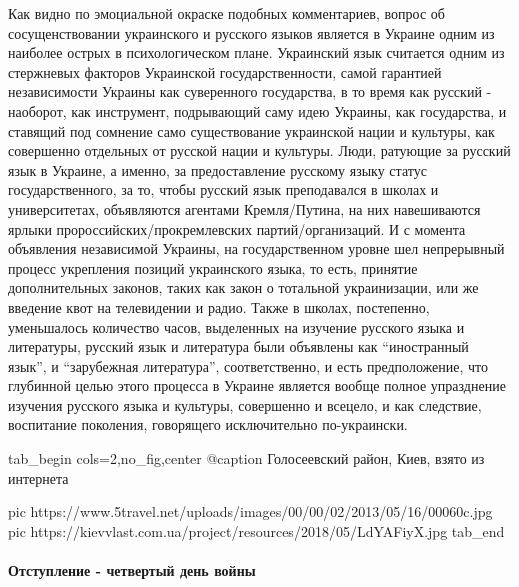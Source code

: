 Как видно по эмоциальной окраске подобных комментариев, вопрос об
сосущенствовании украинского и русского языков является в Украине одним из
наиболее острых в психологическом плане. Украинский язык считается одним из
стержневых факторов Украинской государственности, самой гарантией независимости
Украины как суверенного государства, в то время как русский - наоборот, как
инструмент, подрывающий саму идею Украины, как государства, и ставящий под
сомнение само существование украинской нации и культуры, как совершенно
отдельных от русской нации и культуры. Люди, ратующие за русский язык в
Украине, а именно, за предоставление русскому языку статус государственного, за
то, чтобы русский язык преподавался в школах и университетах, объявляются
агентами Кремля/Путина, на них навешиваются ярлыки пророссийских/прокремлевских
партий/организаций. И с момента объявления независимой Украины, на
государственном уровне шел непрерывный процесс укрепления позиций украинского
языка, то есть, принятие дополнительных законов, таких как закон о тотальной
украинизации, или же введение квот на телевидении и радио. Также в школах,
постепенно, уменьшалось количество часов, выделенных на изучение русского языка
и литературы, русский язык и литература были объявлены как \enquote{иностранный
язык}, и \enquote{зарубежная литература}, соответственно, и есть предположение, что глубинной
целью этого процесса в Украине является вообще полное упразднение изучения
русского языка и культуры, совершенно и всецело, и как следствие, воспитание
поколения, говорящего исключительно по-украински.

\ifcmt
  tab_begin cols=2,no_fig,center
     @caption Голосеевский район, Киев, взято из интернета

     pic https://www.5travel.net/uploads/images/00/00/02/2013/05/16/00060c.jpg
     pic https://kievvlast.com.ua/project/resources/2018/05/LdYAFiyX.jpg
  tab_end
\fi

\paragraph{Отступление - четвертый день войны}

